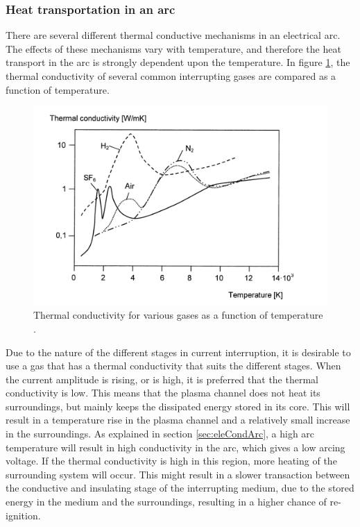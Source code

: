 \documentclass[10pt,b5paper,twoside]{article}
\begin{document}
\subsubsection{Heat transportation in an arc} \label{sec:HeatTransport}
There are several different thermal conductive mechanisms in an electrical arc. The effects of these mechanisms vary with temperature, and therefore the heat transport in the arc is strongly dependent upon the temperature. In figure \ref{fig:tempConGas}, the thermal conductivity of several common interrupting gases are compared as a function of temperature.

\begin{figure}[H]
\centering
\includegraphics[scale=0.83]{Bilder/Theory/thermalCond.png}
\caption{Thermal conductivity for various gases as a function of temperature \cite{bib:HVEbreak}.} \label{fig:tempConGas}
\end{figure}

Due to the nature of the different stages in current interruption, it is desirable to use a gas that has a thermal conductivity that suits the different stages. When the current amplitude is rising, or is high, it is preferred that the thermal conductivity is low. This means that the plasma channel does not heat its surroundings, but mainly keeps the dissipated energy stored in its core. This will result in a temperature rise in the plasma channel and a relatively small increase in the surroundings. As explained in section \ref{sec:eleCondArc}, a high arc temperature will result in high conductivity in the arc, which gives a low arcing voltage. If the thermal conductivity is high in this region, more heating of the surrounding system will occur. This might result in a slower transaction between the conductive and insulating stage of the interrupting medium, due to the stored energy in the medium and the surroundings, resulting in a higher chance of re-ignition.
\end{document}
